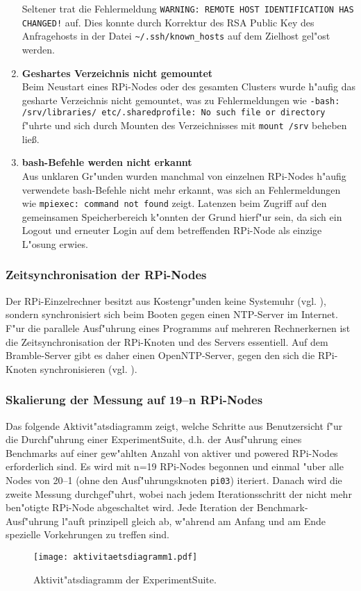 \begin{enumerate}
Seltener trat die Fehlermeldung \texttt{WARNING: REMOTE HOST IDENTIFICATION HAS CHAN\-GED!} auf. Dies konnte durch Korrektur des RSA Public Key des Anfragehosts in der Datei \texttt{\textasciitilde/.ssh/known\_hosts} auf dem Zielhost gel"ost werden. 
	\item \textbf{Geshartes Verzeichnis nicht gemountet}\\
Beim Neustart eines RPi-Nodes oder des gesamten Clusters wurde h"aufig das gesharte Verzeichnis nicht gemountet, was zu Fehlermeldungen wie \texttt{-bash: /srv/libraries/ etc/.sharedprofile: No such file or directory} f"uhrte und sich durch Mounten des Verzeichnisses mit \texttt{mount /srv} beheben lie\ss .
	\item \textbf{bash-Befehle werden nicht erkannt}\\
Aus unklaren Gr"unden wurden manchmal von einzelnen RPi-Nodes h"aufig verwendete bash-Befehle nicht mehr erkannt, was sich an Fehlermeldungen wie \texttt{mpiexec: command not found} zeigt. Latenzen beim Zugriff auf den gemeinsamen Speicherbereich k"onnten der Grund hierf"ur sein, da sich ein Logout und erneuter Login auf dem betreffenden RPi-Node als einzige L"osung erwies. 
\end{enumerate}

\subsubsection{Zeitsynchronisation der RPi-Nodes} 

Der RPi-Einzelrechner besitzt aus Kostengr"unden keine Systemuhr (vgl. \cite{sch13}), sondern synchronisiert sich beim Booten gegen einen NTP-Server im Internet. F"ur die parallele Ausf"uhrung eines Programms auf mehreren Rechnerkernen ist die Zeitsynchronisation der RPi-Knoten und des Servers essentiell. Auf dem Bramble-Server gibt es daher einen OpenNTP-Server, gegen den sich die RPi-Knoten synchronisieren (vgl. \cite{kli13}). 

\subsubsection{Skalierung der Messung auf 19--n RPi-Nodes} 

Das folgende Aktivit"atsdiagramm zeigt, welche Schritte aus Benutzersicht f"ur die Durchf"uhr\-ung einer ExperimentSuite, d.h. der Ausf"uhrung eines Benchmarks auf einer gew"ahlten Anzahl von aktiver und powered RPi-Nodes erforderlich sind. Es wird mit n=19 RPi-Nodes begonnen und einmal "uber alle Nodes von 20--1 (ohne den Ausf"uhrungsknoten \texttt{pi03}) iteriert. Danach wird die zweite Messung durchgef"uhrt, wobei nach jedem Iterationsschritt der nicht mehr ben"otigte RPi-Node abgeschaltet wird. Jede Iteration der Benchmark-Ausf"uhrung l"auft prinzipell gleich ab, w"ahrend am Anfang und am Ende spezielle Vorkehrungen zu treffen sind. 
\begin{figure}[htb]
  \centering
  \texttt{[image: aktivitaetsdiagramm1.pdf]}\\ 
  \caption{Aktivit"atsdiagramm der ExperimentSuite.}
  \label{fig:Aktivitaetsdiagramm}
\end{figure}

